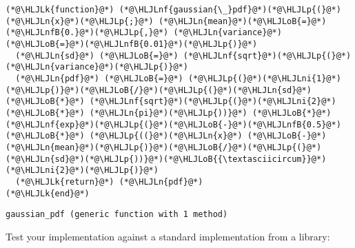 \documentclass[12pt,a4paper]{article}
\newcommand{\HLJLk}[1]{\textcolor[RGB]{148,91,176}{\textbf{#1}}}
\newcommand{\HLJLn}[1]{#1}
\newcommand{\HLJLnf}[1]{\textcolor[RGB]{66,102,213}{#1}}
\newcommand{\HLJLnfB}[1]{\textcolor[RGB]{59,151,46}{#1}}
\newcommand{\HLJLni}[1]{\textcolor[RGB]{59,151,46}{#1}}
\newcommand{\HLJLoB}[1]{\textcolor[RGB]{102,102,102}{\textbf{#1}}}
\newcommand{\HLJLp}[1]{#1}
\begin{document}
\begin{lstlisting}
(*@\HLJLk{function}@*) (*@\HLJLnf{gaussian{\_}pdf}@*)(*@\HLJLp{(}@*)(*@\HLJLn{x}@*)(*@\HLJLp{;}@*) (*@\HLJLn{mean}@*)(*@\HLJLoB{=}@*)(*@\HLJLnfB{0.}@*)(*@\HLJLp{,}@*) (*@\HLJLn{variance}@*)(*@\HLJLoB{=}@*)(*@\HLJLnfB{0.01}@*)(*@\HLJLp{)}@*)
  (*@\HLJLn{sd}@*) (*@\HLJLoB{=}@*) (*@\HLJLnf{sqrt}@*)(*@\HLJLp{(}@*)(*@\HLJLn{variance}@*)(*@\HLJLp{)}@*)
  (*@\HLJLn{pdf}@*) (*@\HLJLoB{=}@*) (*@\HLJLp{(}@*)(*@\HLJLni{1}@*)(*@\HLJLp{)}@*)(*@\HLJLoB{/}@*)(*@\HLJLp{(}@*)(*@\HLJLn{sd}@*) (*@\HLJLoB{*}@*) (*@\HLJLnf{sqrt}@*)(*@\HLJLp{(}@*)(*@\HLJLni{2}@*) (*@\HLJLoB{*}@*) (*@\HLJLn{pi}@*)(*@\HLJLp{))}@*) (*@\HLJLoB{*}@*) (*@\HLJLnf{exp}@*)(*@\HLJLp{(}@*)(*@\HLJLoB{-}@*)(*@\HLJLnfB{0.5}@*) (*@\HLJLoB{*}@*) (*@\HLJLp{((}@*)(*@\HLJLn{x}@*) (*@\HLJLoB{-}@*) (*@\HLJLn{mean}@*)(*@\HLJLp{)}@*)(*@\HLJLoB{/}@*)(*@\HLJLp{(}@*)(*@\HLJLn{sd}@*)(*@\HLJLp{))}@*)(*@\HLJLoB{{\textasciicircum}}@*)(*@\HLJLni{2}@*)(*@\HLJLp{)}@*)
  (*@\HLJLk{return}@*) (*@\HLJLn{pdf}@*)
(*@\HLJLk{end}@*)
\end{lstlisting}

\begin{lstlisting}
gaussian_pdf (generic function with 1 method)
\end{lstlisting}


Test your implementation against a standard implementation from a library:
\end{document}
